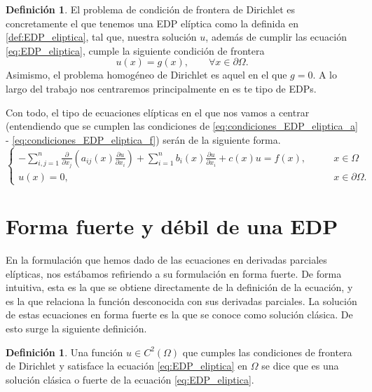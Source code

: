 \documentclass[a4paper,11pt,spanish, twoside, leqno]{tfg-uam}
\theoremstyle{definition}
\newtheorem{defin}[teor]{Definici\'on}
\begin{document}
\begin{mdframed}
\begin{defin}    
    El problema de condición de frontera de Dirichlet es concretamente el que tenemos una EDP elíptica como la definida en \ref{def:EDP_eliptica}, tal que, nuestra solución $u$, además de cumplir las ecuación \eqref{eq:EDP_eliptica}, cumple la siguiente condición de frontera
    \begin{equation}
        u(x) = g(x), \qquad \forall x\in\partial\Omega.
    \end{equation}
    Asimismo, el problema homogéneo de Dirichlet es aquel en el que $g=0$. A lo largo del trabajo nos centraremos principalmente en es te tipo de EDPs.
\end{defin}
\end{mdframed}

Con todo, el tipo de ecuaciones elípticas en el que nos vamos a centrar (entendiendo que se cumplen las condiciones de \eqref{eq:condiciones_EDP_eliptica_a} - \eqref{eq:condiciones_EDP_eliptica_f}) serán de la siguiente forma.
\begin{equation}
    \begin{cases}
        -\sum_{i,j=1}^{n} \frac{\partial}{\partial x_j}\left( a_{ij}(x)\frac{\partial u}{\partial x_i}\right) + \sum_{i=1}^{n} b_i(x)\frac{\partial u}{\partial x_i} + c(x)u = f(x), \qquad & x\in\Omega \\
        u(x) = 0, & x\in\partial\Omega.
    \end{cases}
\end{equation}

\section{Forma fuerte y débil de una EDP}
En la formulación que hemos dado de las ecuaciones en derivadas parciales elípticas, nos estábamos refiriendo a su formulación en forma fuerte. De forma intuitiva, esta es la que se obtiene directamente de la definición de la ecuación, y es la que relaciona la función desconocida con sus derivadas parciales. La solución de estas ecuaciones en forma fuerte es la que se conoce como solución clásica. De esto surge la siguiente definición.

\begin{mdframed}
\begin{defin}
    Una función $u \in C^2(\Omega)$ que cumples las condiciones de frontera de Dirichlet y satisface la ecuación \eqref{eq:EDP_eliptica} en $\Omega$ se dice que es una solución clásica o fuerte de la ecuación \eqref{eq:EDP_eliptica}. 
\end{defin}
\end{mdframed}
\end{document}
